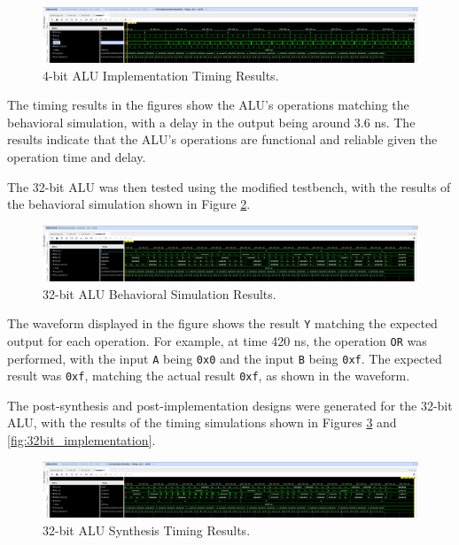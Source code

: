 \documentclass[CMPE]{../KGCOEReport}
\begin{document}
\begin{figure}[H]
    \centering
    \includegraphics[width=1\textwidth]{implement.png}
    \caption{4-bit ALU Implementation Timing Results.}
    \label{fig:4bit_implementation}
\end{figure}

The timing results in the figures show the ALU's operations matching the behavioral simulation, with a delay in the output being around 3.6 ns. The results indicate that the ALU's operations are functional and reliable given the operation time and delay.

The 32-bit ALU was then tested using the modified testbench, with the results of the behavioral simulation shown in Figure \ref{fig:32bit_behavior}.

\begin{figure}[H]
    \centering
    \includegraphics[width=1\textwidth]{behavior2.png}
    \caption{32-bit ALU Behavioral Simulation Results.}
    \label{fig:32bit_behavior}
\end{figure}

The waveform displayed in the figure shows the result \verb|Y| matching the expected output for each operation. For example, at time 420 ns, the operation \verb|OR| was performed, with the input \verb|A| being \verb|0x0| and the input \verb|B| being \verb|0xf|. The expected result was \verb|0xf|, matching the actual result \verb|0xf|, as shown in the waveform.

The post-synthesis and post-implementation designs were generated for the 32-bit ALU, with the results of the timing simulations shown in Figures \ref{fig:32bit_synthesis} and \ref{fig:32bit_implementation}.

\begin{figure}[H]
    \centering
    \includegraphics[width=1\textwidth]{synth2.png}
    \caption{32-bit ALU Synthesis Timing Results.}
    \label{fig:32bit_synthesis}
\end{figure}
\end{document}
